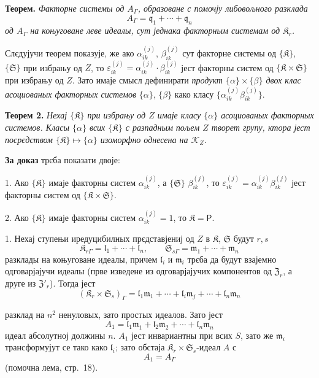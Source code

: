 \documentclass[11pt]{article}
\begin{document}
\textbf{Теорем.} \emph{Факторне системы од \(A_\Gamma\), образоване с помочју либовољного разклада}
\[
A_\Gamma=\mathfrak q_1+\cdots+\mathfrak q_n
\]
\emph{од \(A_\Gamma\) на коњуговане лєве идеалы, сут једнака факторным системам од \(\mathfrak K_r\).}

Слєдујучи теорем показује, же ако \(\alpha_{ik}^{(j)}\), \(\beta_{ik}^{(j)}\) сут факторне системы од \(\{\mathfrak K\}\), \(\{\mathfrak S\}\) при избрању од \(Z\), то \(\varepsilon_{ik}^{(j)}=\alpha_{ik}^{(j)}\cdot\beta_{ik}^{(j)}\) јест факторны систем од \(\{\mathfrak K\times\mathfrak S\}\) при избрању од \(Z\). Зато имаје смысл дефинирати \emph{продукт \(\{\alpha\}\times\{\beta\}\) двох клас асоциованых факторных системов} \(\{\alpha\}\), \(\{\beta\}\) како класу \(\{\alpha_{ik}^{(j)}\beta_{ik}^{(j)}\}\).

\textbf{Теорем 2.} \emph{Нехај \(\{\mathfrak K\}\) при избрању од \(Z\) имаје класу \(\{\alpha\}\) асоциованых факторных системов. Класы \(\{\alpha\}\) всих \(\{\mathfrak K\}\) с разпадным пољем \(Z\) творет групу, ктора јест посрєдством \(\{\mathfrak K\}\mapsto\{\alpha\}\) изоморфно однесена на \(\mathscr K_Z\).}

\textbf{За доказ} трєба показати двоје:

1. Ако \(\{\mathfrak K\}\) имаје факторны систем \(\alpha_{ik}^{(j)}\), а \(\{\mathfrak S\}\) \(\beta_{ik}^{(j)}\), то \(\varepsilon_{ik}^{(j)}=\alpha_{ik}^{(j)}\beta_{ik}^{(j)}\) јест факторны систем од \(\{\mathfrak K\times\mathfrak S\}\).

2. Ако \(\{\mathfrak K\}\) имаје факторны систем \(\alpha_{ik}^{(j)}=1\), то \(\mathfrak K=\mathsf P\).

1. Нехај ступењи иредуцибилных прєдставјениј од \(Z\) в \(\mathfrak K\), \(\mathfrak S\) будут \(r,s\)
\[
\mathfrak K_{r\Gamma}=\mathfrak l_1+\cdots+\mathfrak l_n,\qquad
\mathfrak S_{s\Gamma}=\mathfrak m_1+\cdots+\mathfrak m_n
\]
разклады на коњуговане идеалы, причем \(\mathfrak l_i\) и \(\mathfrak m_i\) трєба да будут взајемно одговарјајучи идеалы (прве изведене из одговарјајучих компонентов од \(\mathfrak Z_r\), а друге из \(\mathfrak Z'_r\)). Тогда јест
\[
(\mathfrak K_r\times\mathfrak S_s)_\Gamma
=\mathfrak l_1\mathfrak m_1+\cdots+\mathfrak l_i\mathfrak m_j+\cdots+\mathfrak l_n\mathfrak m_n
\]

разклад на \(n^2\) ненуловых, зато простых идеалов. Зато јест
\[
A_1=\mathfrak l_1\mathfrak m_1+\mathfrak l_2\mathfrak m_2+\cdots+\mathfrak l_n\mathfrak m_n
\]
идеал абсолутној должины \(n\). \(A_1\) јест инвариантны при всих \(S\), зато же \(\mathfrak m_i\) трансформујут се тако како \(\mathfrak l_i\); зато обстаја \(\mathfrak K_r\times\mathfrak S_s\)-идеал \(A\) с
\[
A_1=A_\Gamma
\]
(помочна лема, стр.~18).
\end{document}
